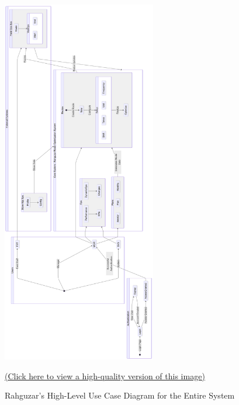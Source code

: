\begin{center}
    \begin{figure}[H]
        \centering
        \includegraphics[width=0.6\textwidth]{images/Rahguzar - Use Case - HighLevel (1).png} 
        \caption{Rahguzar's High-Level Use Case Diagram for the Entire System}
\href{https://tinyurl.com/USECASEDIAG}{(Click here to view a high-quality version of this image)}
    \end{figure}


\end{center}
